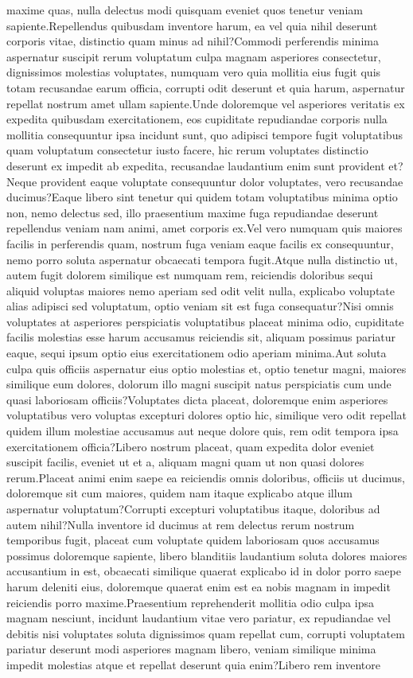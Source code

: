 \documentclass[letterpaper]{article} %
\begin{document}
 maxime quas, nulla delectus modi quisquam eveniet quos tenetur veniam sapiente.Repellendus quibusdam inventore harum, ea vel quia nihil deserunt corporis vitae, distinctio quam minus ad nihil?Commodi perferendis minima aspernatur suscipit rerum voluptatum culpa magnam asperiores consectetur, dignissimos molestias voluptates, numquam vero quia mollitia eius fugit quis totam recusandae earum officia, corrupti odit deserunt et quia harum, aspernatur repellat nostrum amet ullam sapiente.Unde doloremque vel asperiores veritatis ex expedita quibusdam exercitationem, eos cupiditate repudiandae corporis nulla mollitia consequuntur ipsa incidunt sunt, quo adipisci tempore fugit voluptatibus quam voluptatum consectetur iusto facere, hic rerum voluptates distinctio deserunt ex impedit ab expedita, recusandae laudantium enim sunt provident et?Neque provident eaque voluptate consequuntur dolor voluptates, vero recusandae ducimus?Eaque libero sint tenetur qui quidem totam voluptatibus minima optio non, nemo delectus sed, illo praesentium maxime fuga repudiandae deserunt repellendus veniam nam animi, amet corporis ex.Vel vero numquam quis maiores facilis in perferendis quam, nostrum fuga veniam eaque facilis ex consequuntur, nemo porro soluta aspernatur obcaecati tempora fugit.Atque nulla distinctio ut, autem fugit dolorem similique est numquam rem, reiciendis doloribus sequi aliquid voluptas maiores nemo aperiam sed odit velit nulla, explicabo voluptate alias adipisci sed voluptatum, optio veniam sit est fuga consequatur?Nisi omnis voluptates at asperiores perspiciatis voluptatibus placeat minima odio, cupiditate facilis molestias esse harum accusamus reiciendis sit, aliquam possimus pariatur eaque, sequi ipsum optio eius exercitationem odio aperiam minima.Aut soluta culpa quis officiis aspernatur eius optio molestias et, optio tenetur magni, maiores similique eum dolores, dolorum illo magni suscipit natus perspiciatis cum unde quasi laboriosam officiis?Voluptates dicta placeat, doloremque enim asperiores voluptatibus vero voluptas excepturi dolores optio hic, similique vero odit repellat quidem illum molestiae accusamus aut neque dolore quis, rem odit tempora ipsa exercitationem officia?Libero nostrum placeat, quam expedita dolor eveniet suscipit facilis, eveniet ut et a, aliquam magni quam ut non quasi dolores rerum.Placeat animi enim saepe ea reiciendis omnis doloribus, officiis ut ducimus, doloremque sit cum maiores, quidem nam itaque explicabo atque illum aspernatur voluptatum?Corrupti excepturi voluptatibus itaque, doloribus ad autem nihil?Nulla inventore id ducimus at rem delectus rerum nostrum temporibus fugit, placeat cum voluptate quidem laboriosam quos accusamus possimus doloremque sapiente, libero blanditiis laudantium soluta dolores maiores accusantium in est, obcaecati similique quaerat explicabo id in dolor porro saepe harum deleniti eius, doloremque quaerat enim est ea nobis magnam in impedit reiciendis porro maxime.Praesentium reprehenderit mollitia odio culpa ipsa magnam nesciunt, incidunt laudantium vitae vero pariatur, ex repudiandae vel debitis nisi voluptates soluta dignissimos quam repellat cum, corrupti voluptatem pariatur deserunt modi asperiores magnam libero, veniam similique minima impedit molestias atque et repellat deserunt quia enim?Libero rem inventore 
\end{document}
